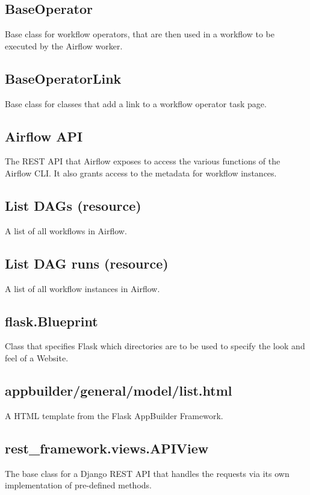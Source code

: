 \subsection{BaseOperator}
Base class for workflow operators, that are then used in a workflow to be executed by the
Airflow worker.

\subsection{BaseOperatorLink}
Base class for classes that add a link to a workflow operator task page.

\subsection{Airflow API}
The REST API that Airflow exposes to access the various functions of the Airflow CLI. It also grants access to the metadata for workflow instances.

\subsection{List DAGs (resource)}
A list of all workflows in Airflow.

\subsection{List DAG runs (resource)}
A list of all workflow instances in Airflow.

\subsection{flask.Blueprint}
Class that specifies Flask which directories are to be used to specify the look and feel of a Website.

\subsection{appbuilder/general/model/list.html}
A HTML template from the Flask AppBuilder Framework.

\subsection{rest\_framework.views.APIView}
The base class for a Django REST API that handles the requests via its own implementation of pre-defined methods.

